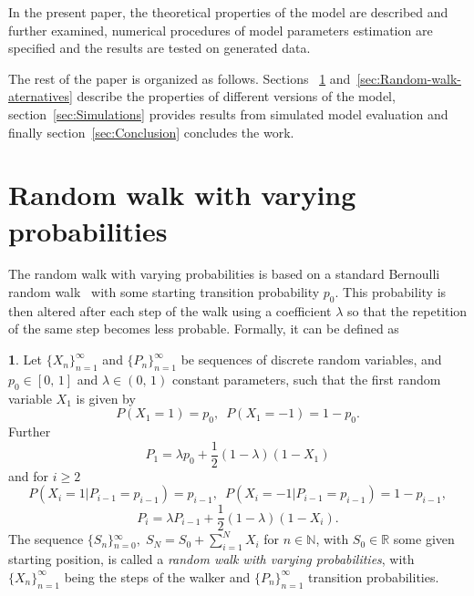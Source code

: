 \documentclass{amsart}
\theoremstyle{definition}
\newtheorem{defn}[thm]{\protect\definitionname}
\theoremstyle{plain}
\theoremstyle{plain}
\theoremstyle{plain}
\numberwithin{equation}{section}
\providecommand{\definitionname}{Definition}
\begin{document}
    In the present paper, the theoretical properties of the model are
    described and further examined, numerical procedures of model
    parameters estimation are specified and the results are tested on
    generated data.

    The rest of the paper is organized as follows.
    Sections
    ~\ref{sec:Random-walk-with} and~\ref{sec:Random-walk-aternatives}
    describe the properties of different versions of the model,
    section~\ref{sec:Simulations} provides results from simulated
    model evaluation and finally section~\ref{sec:Conclusion} concludes
    the work.


    \section{Random walk with varying probabilities}\label{sec:Random-walk-with}

    The random walk with varying probabilities is based on a standard
    Bernoulli random walk~\cite{feller1957introduction} with some starting
    transition probability $p_{0}$.
    This probability is then altered
    after each step of the walk using a coefficient $\lambda$ so that
    the repetition of the same step becomes less probable.
    Formally, it
    can be defined as
    \begin{defn}
        \label{success_punished}Let ${\{X_{n}\}}_{n=1}^{\infty}$ and ${\{P_{n}\}}_{n=1}^{\infty}$
        be sequences of discrete random variables, and $p_{0}\in[0,\,1]$
        and $\lambda\in(0,\,1)$ constant parameters, such that the first
        random variable $X_{1}$ is given by
        \[
            P(X_{1}=1)=p_{0},\,\,\,
            P(X_{1}=-1)=1-p_{0}.
        \]
        Further
        \begin{equation}
            P_{1}=\lambda p_{0}+\frac{1}{2}(1-\lambda)(1-X_{1})\label{eq:P!1_def}
        \end{equation}
        and for $i\geq2$
        \[
            P(X_{i}=1|P_{i-1}=p_{i-1})=p_{i-1},\,\,\,
            P(X_{i}=-1|P_{i-1}=p_{i-1})=1-p_{i-1},
        \]
        \begin{equation}
            P_{i}=\lambda P_{i-1}+\frac{1}{2}(1-\lambda)(1-X_{i}).\label{eq:Pi_def}
        \end{equation}
        The sequence ${\{S_{n}\}}{}_{n=0}^{\infty},\;S_{N}=S_{0}+\sum_{i=1}^{N}X_{i}$
        for $n\in\mathbb{N}$, with $S_{0}\in\mathbb{R}$ some given starting
        position, is called a \emph{random walk with varying probabilities},
        with ${\{X_{n}\}}_{n=1}^{\infty}$ being the steps of the walker and
        ${\{P_{n}\}}_{n=1}^{\infty}$ transition probabilities.
    \end{defn}
\end{document}
